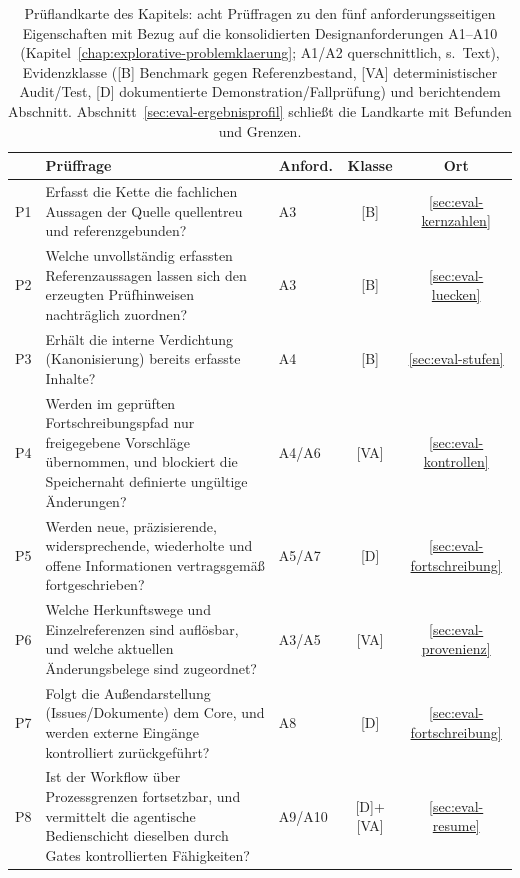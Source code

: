\begin{table}[!htb]
  \centering
  \small
  \begin{tabular}{l>{\raggedright\arraybackslash}p{}lcc}
    \hline
    & \textbf{Prüffrage} & \textbf{Anford.} & \textbf{Klasse} & \textbf{Ort} \\
    \hline
    P1 & Erfasst die Kette die fachlichen Aussagen der Quelle quellentreu und referenzgebunden? & A3 & [B] & \ref{sec:eval-kernzahlen} \\
    P2 & Welche unvollständig erfassten Referenzaussagen lassen sich den erzeugten Prüfhinweisen nachträglich zuordnen? & A3 & [B] & \ref{sec:eval-luecken} \\
    P3 & Erhält die interne Verdichtung (Kanonisierung) bereits erfasste Inhalte? & A4 & [B] & \ref{sec:eval-stufen} \\
    P4 & Werden im geprüften Fortschreibungspfad nur freigegebene Vorschläge übernommen, und blockiert die Speichernaht definierte ungültige Änderungen? & A4/A6 & [VA] & \ref{sec:eval-kontrollen} \\
    P5 & Werden neue, präzisierende, widersprechende, wiederholte und offene Informationen vertragsgemäß fortgeschrieben? & A5/A7 & [D] & \ref{sec:eval-fortschreibung} \\
    P6 & Welche Herkunftswege und Einzelreferenzen sind auflösbar, und welche aktuellen Änderungsbelege sind zugeordnet? & A3/A5 & [VA] & \ref{sec:eval-provenienz} \\
    P7 & Folgt die Außendarstellung (Issues/Dokumente) dem Core, und werden externe Eingänge kontrolliert zurückgeführt? & A8 & [D] & \ref{sec:eval-fortschreibung} \\
    P8 & Ist der Workflow über Prozessgrenzen fortsetzbar, und vermittelt die agentische Bedienschicht dieselben durch Gates kontrollierten Fähigkeiten? & A9/A10 & [D]+[VA] & \ref{sec:eval-resume} \\
    \hline
  \end{tabular}
  \caption[Prüffragen und zugeordnete Nachweise]{Prüflandkarte des Kapitels: acht Prüffragen zu den fünf
    anforderungsseitigen Eigenschaften mit Bezug auf die
    konsolidierten Designanforderungen A1--A10 (Kapitel~\ref{chap:explorative-problemklaerung}; A1/A2
    querschnittlich, s.\ Text), Evidenzklasse ([B] Benchmark gegen
    Referenzbestand, [VA] deterministischer Audit/Test,
    [D] dokumentierte Demonstration/Fallprüfung) und berichtendem Abschnitt.
    Abschnitt~\ref{sec:eval-ergebnisprofil} schließt die Landkarte mit Befunden und Grenzen.}
  \label{t:eval-pruefkarte}
\end{table}
